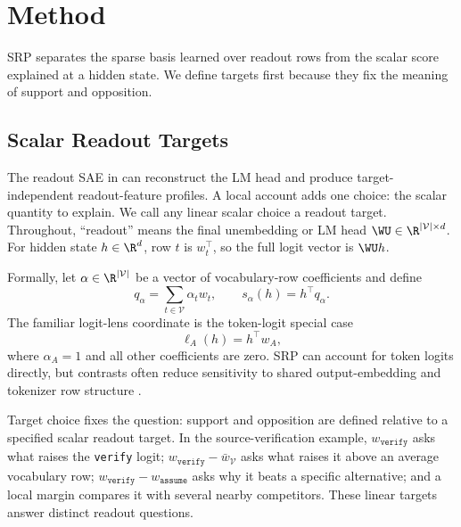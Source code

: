\section{Method}
\label{sec:method}

SRP separates the sparse basis learned over readout rows from the scalar score
explained at a hidden state. We define targets first because they fix the
meaning of support and opposition.

\subsection{Scalar Readout Targets}
\label{sec:problem-setup}

The readout SAE in  can reconstruct the LM head and produce
target-independent readout-feature profiles. A local account adds one choice:
the scalar quantity to explain. We call any linear scalar choice a readout
target. Throughout, ``readout'' means the final unembedding or LM head
\(\WU\in\R^{|\mathcal{V}|\times d}\). For hidden state \(h\in\R^d\), row \(t\)
is \(w_t^\top\), so the full logit vector is \(\WU h\).

Formally, let \(\alpha\in\R^{|\mathcal{V}|}\) be a vector of vocabulary-row
coefficients and define
\[
    q_\alpha = \sum_{t\in\mathcal{V}} \alpha_t w_t,
    \qquad
    s_\alpha(h)=h^\top q_\alpha .
\]
The familiar logit-lens coordinate is the token-logit special case
\[
    \ell_A(h)=h^\top w_A,
\]
where \(\alpha_A=1\) and all other coefficients are zero. SRP can account for
token logits directly, but contrasts often reduce sensitivity to shared
output-embedding and tokenizer row structure
\citep{press2017outputembedding,inan2017tying,yang2018softmaxbottleneck,bostrom2020bpe}.

Target choice fixes the question: support and opposition are defined relative to
a specified scalar readout target. In the source-verification example,
\(w_{\texttt{verify}}\) asks what raises the \texttt{verify} logit;
\(w_{\texttt{verify}}-\bar{w}_{\mathcal{V}}\) asks what raises it above an
average vocabulary row; \(w_{\texttt{verify}}-w_{\texttt{assume}}\) asks why it
beats a specific alternative; and a local margin compares it with several nearby
competitors. These linear targets answer distinct readout questions.

